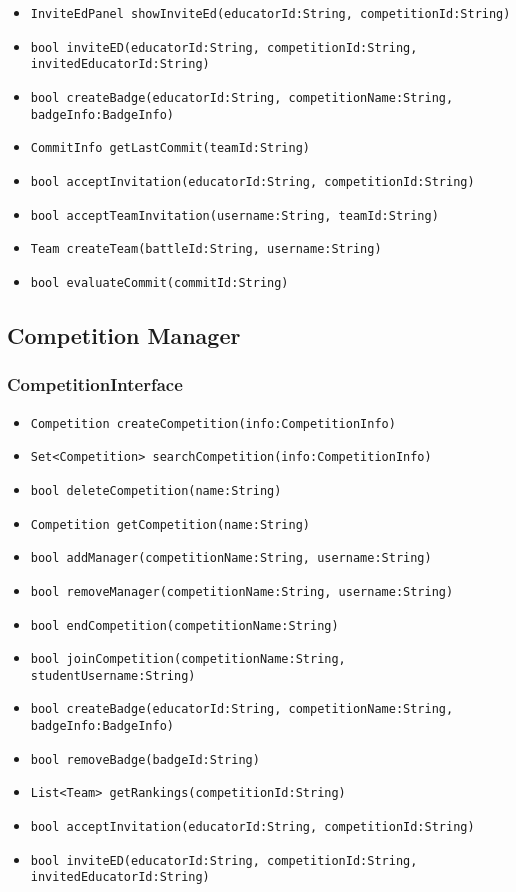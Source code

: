 \begin{itemize}
    \item \texttt{InviteEdPanel showInviteEd(educatorId:String, competitionId:String)}%
    \item \texttt{bool inviteED(educatorId:String, competitionId:String, invitedEducatorId:String)}%
    \item \texttt{bool createBadge(educatorId:String, competitionName:String, \\badgeInfo:BadgeInfo)}%
    \item \texttt{CommitInfo getLastCommit(teamId:String)}%
    \item \texttt{bool acceptInvitation(educatorId:String, competitionId:String)}%
    \item \texttt{bool acceptTeamInvitation(username:String, teamId:String)}%
    \item \texttt{Team createTeam(battleId:String, username:String)}%
    \item \texttt{bool evaluateCommit(commitId:String)}%
\end{itemize}

\subsection{Competition Manager}
\subsubsection{CompetitionInterface}
\begin{itemize}
    \item \texttt{Competition createCompetition(info:CompetitionInfo)}%
    \item \texttt{Set<Competition> searchCompetition(info:CompetitionInfo)}
    \item \texttt{bool deleteCompetition(name:String)}
    \item \texttt{Competition getCompetition(name:String)}%
    \item \texttt{bool addManager(competitionName:String, username:String)}%
    \item \texttt{bool removeManager(competitionName:String, username:String)}
    \item \texttt{bool endCompetition(competitionName:String)}
    \item \texttt{bool joinCompetition(competitionName:String, studentUsername:String)}%
    \item \texttt{bool createBadge(educatorId:String, competitionName:String,\\badgeInfo:BadgeInfo)}%
    \item \texttt{bool removeBadge(badgeId:String)}
    \item \texttt{List<Team> getRankings(competitionId:String)}
    \item \texttt{bool acceptInvitation(educatorId:String, competitionId:String)}%
    \item \texttt{bool inviteED(educatorId:String, competitionId:String,\\invitedEducatorId:String)}%
\end{itemize}

